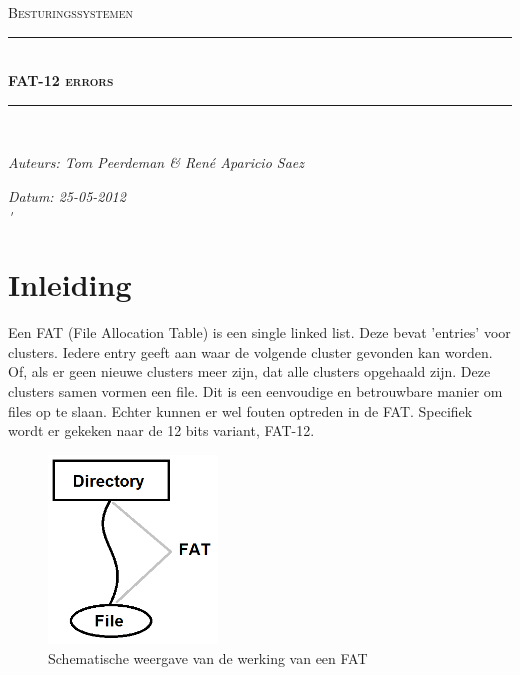 \documentclass[11pt]{article}
\newcommand{\HRule}{\rule{\linewidth}{0.5mm}}
\begin{document}
	\begin{titlepage}
	\begin{center}
		\textsc{\Large Besturingssystemen}\\[0.5cm]
		\HRule \\[0,4cm]
		\textsc{\huge \bfseries FAT-12 errors}
		\HRule \\[2cm]
		\begin{minipage}{0.4\textwidth}
			\begin{flushleft}\large
				\emph{Auteurs: Tom Peerdeman \& Ren\'e Aparicio Saez}\\
			\end{flushleft}
		\end{minipage}
		\begin{minipage}{0.4\textwidth}
			\begin{flushright}\large
			\emph{Datum: 25-05-2012\\\'}\\
			\end{flushright}
		\end{minipage}
	\end{center}
	\end{titlepage}

	\tableofcontents
	\newpage

	\section{Inleiding}\label{sec:inleiding}
	Een FAT (File Allocation Table) is een single linked list. Deze bevat 'entries' voor clusters. Iedere entry geeft aan waar de volgende cluster gevonden kan worden. Of, als er geen nieuwe clusters meer zijn, dat alle clusters opgehaald zijn. Deze clusters samen vormen een file. Dit is een eenvoudige en betrouwbare manier om files op te slaan. Echter kunnen er wel fouten optreden in de FAT. Specifiek wordt er gekeken naar de 12 bits variant, FAT-12.
	\begin{figure}[h]
		\begin{center}
		\includegraphics[width=0.4\textwidth]{fatgoed.png}
		\caption{Schematische weergave van de werking van een 	FAT}
		\end{center}
	\end{figure}
\end{document}
